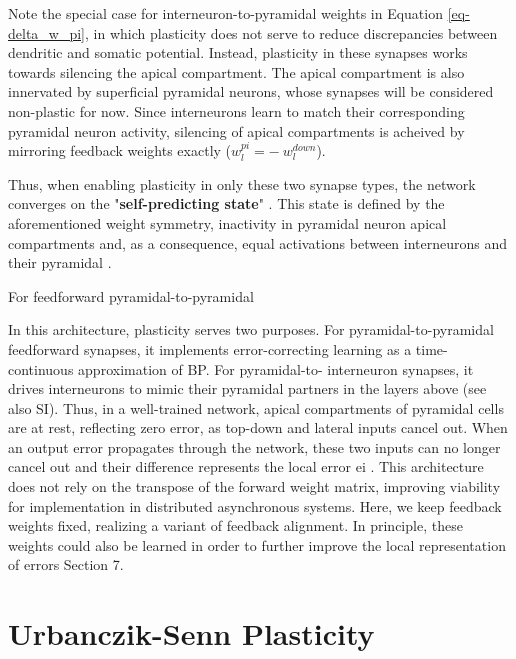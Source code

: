 Note the special case for interneuron-to-pyramidal weights in Equation \ref{eq-delta_w_pi}, in which plasticity does not serve to reduce
discrepancies between dendritic and somatic potential. Instead, plasticity in these synapses works towards silencing the
apical compartment. The apical compartment is also innervated by superficial pyramidal neurons, whose synapses will
be considered non-plastic for now. Since interneurons learn to match their corresponding pyramidal neuron activity,
silencing of apical compartments is acheived by mirroring feedback weights exactly ($w_l^{pi} = -\ w_l^{down}$).\newline

Thus, when enabling plasticity in only these two synapse types, the network converges on the
"\textbf{self-predicting state}" \citep{sacramento2018dendritic}.
This state is defined by the aforementioned weight symmetry, inactivity in pyramidal neuron apical compartments and,
as a consequence, equal activations between interneurons and their pyramidal .




For feedforward pyramidal-to-pyramidal

In this architecture, plasticity serves two purposes. For pyramidal-to-pyramidal feedforward synapses,
it implements error-correcting learning as a time-continuous approximation of BP. For pyramidal-to-
interneuron synapses, it drives interneurons to mimic their pyramidal partners in the layers above (see
also SI). Thus, in a well-trained network, apical compartments of pyramidal cells are at rest, reflecting
zero error, as top-down and lateral inputs cancel out. When an output error propagates through the
network, these two inputs can no longer cancel out and their difference represents the local error ei .
This architecture does not rely on the transpose of the forward weight matrix, improving viability for
implementation in distributed asynchronous systems. Here, we keep feedback weights fixed, realizing
a variant of feedback alignment. In principle, these weights could also be learned in order to further
improve the local representation of errors Section 7.







\section{Urbanczik-Senn Plasticity}\label{sec-urb-senn-plast}

